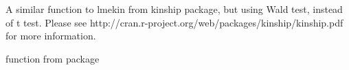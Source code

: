 \begin{Description}\relax
A similar function to lmekin from kinship package, but using Wald test, instead of t test. Please see http://cran.r-project.org/web/packages/kinship/kinship.pdf
for more information.
\end{Description}
\begin{SeeAlso}\relax
{} function from package 
\end{SeeAlso}

